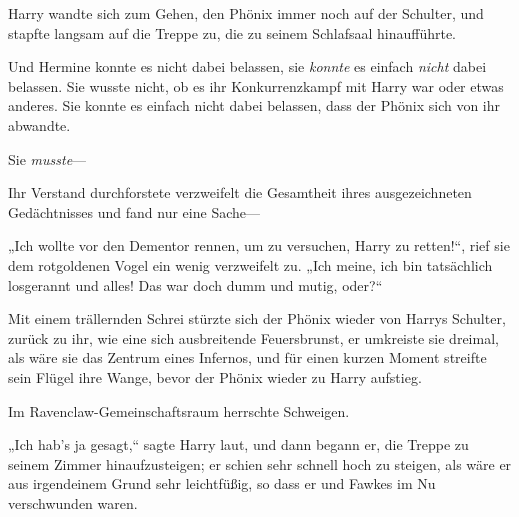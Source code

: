 Harry wandte sich zum Gehen, den Phönix immer noch auf der Schulter, und stapfte langsam auf die Treppe zu, die zu seinem Schlafsaal hinaufführte.

Und Hermine konnte es nicht dabei belassen, sie \emph{konnte} es einfach \emph{nicht} dabei belassen. Sie wusste nicht, ob es ihr Konkurrenzkampf mit Harry war oder etwas anderes. Sie konnte es einfach nicht dabei belassen, dass der Phönix sich von ihr abwandte.

Sie \emph{musste}—

Ihr Verstand durchforstete verzweifelt die Gesamtheit ihres ausgezeichneten Gedächtnisses und fand nur eine Sache—

„Ich wollte vor den Dementor rennen, um zu versuchen, Harry zu retten!“, rief sie dem rotgoldenen Vogel ein wenig verzweifelt zu. „Ich meine, ich bin tatsächlich losgerannt und alles! Das war doch dumm und mutig, oder?“

Mit einem trällernden Schrei stürzte sich der Phönix wieder von Harrys Schulter, zurück zu ihr, wie eine sich ausbreitende Feuersbrunst, er umkreiste sie dreimal, als wäre sie das Zentrum eines Infernos, und für einen kurzen Moment streifte sein Flügel ihre Wange, bevor der Phönix wieder zu Harry aufstieg.

Im Ravenclaw-Gemeinschaftsraum herrschte Schweigen.

„Ich hab’s ja gesagt,“ sagte Harry laut, und dann begann er, die Treppe zu seinem Zimmer hinaufzusteigen; er schien sehr schnell hoch zu steigen, als wäre er aus irgendeinem Grund sehr leichtfüßig, so dass er und Fawkes im Nu verschwunden waren.

